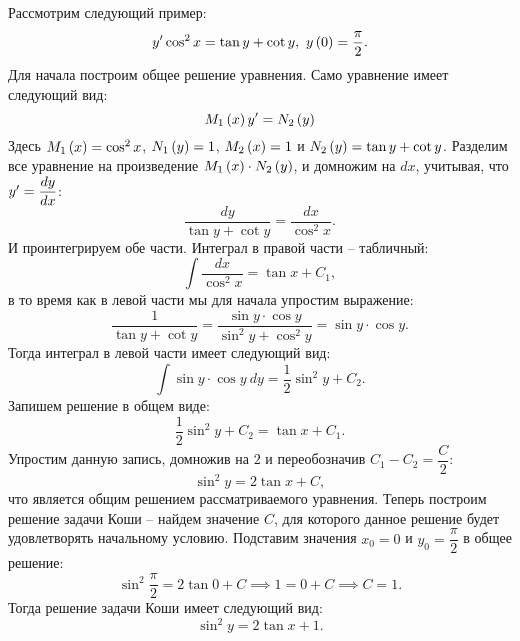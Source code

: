 		Рассмотрим следующий пример:
		\[ y' \cos^2{x} = \tan{y} + \cot{y}, ~ y\left( 0 \right) = \frac{\pi}{2}. \]
		Для начала построим общее решение уравнения. Само уравнение имеет следующий вид:
		\[ M_1 \left( x \right) y' = N_2 \left( y \right) \]
		Здесь $M_1 \left( x \right) = \cos^2{x}$, $N_1 \left( y \right) = 1$, $M_2 \left( x \right) = 1$ и $N_2 \left( y \right) = \tan{y} + \cot{y}$.
		Разделим все уравнение на произведение $M_1 \left( x \right) \cdot N_2 \left( y \right)$, и домножим на $dx$, учитывая, что $y' = \dfrac{d y}{d x}$:
		\[ \frac{dy}{\tan{y} + \cot{y}} = \frac{dx}{\cos^2{x}}. \]
		И проинтегрируем обе части. Интеграл в правой части -- табличный:
		\[ \int \frac{dx}{\cos^2{x}} = \tan{x} + C_1, \]
		в то время как в левой части мы для начала упростим выражение:
		\[ \frac{1}{\tan{y} + \cot{y}} = \frac{\sin{y} \cdot \cos{y}}{\sin^2{y} + \cos^2{y}} = \sin{y} \cdot \cos{y}. \]
		Тогда интеграл в левой части имеет следующий вид:
		\[ \int \sin{y} \cdot \cos{y} ~ dy = \frac{1}{2} \sin^2{y} + C_2. \]
		Запишем решение в общем виде:
		\[ \frac{1}{2} \sin^2{y} + C_2 = \tan{x} + C_1. \]
		Упростим данную запись, домножив на $2$ и переобозначив $C_1 - C_2 = \dfrac{C}{2}$:
		\[ \sin^2{y} = 2 \tan{x} + C, \]
		что является общим решением рассматриваемого уравнения.
		Теперь построим решение задачи Коши -- найдем значение $C$, для которого данное решение будет удовлетворять начальному условию. Подставим значения $x_0 = 0$ и $y_0 = \dfrac{\pi}{2}$ в общее решение:
		\[ \sin^2{\frac{\pi}{2}} = 2 \tan{0} + C \implies 1 = 0 + C \implies C = 1. \]
		Тогда решение задачи Коши имеет следующий вид:
		\[ \sin^2{y} = 2 \tan{x} + 1. \]
	
	\pagebreak
